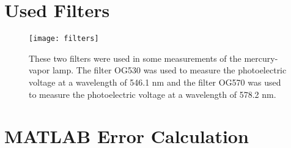 \begin{appendix}
	\section{Used Filters}
	\label{sec:filters}
	\begin{figure}[H]
		\centering
		\texttt{[image: filters]}
		\caption{These two filters were used in some measurements of the mercury-vapor lamp. The filter OG530 was used to measure the photoelectric voltage at a wavelength of 546.1 nm and the filter OG570 was used to measure the photoelectric voltage at a wavelength of 578.2 nm.}
		\label{fig:filters}
	\end{figure}
	
	\newpage
	
	\section{MATLAB Error Calculation}
	\label{sec:MATLAB_Error_Calculation}
	
\end{appendix}
